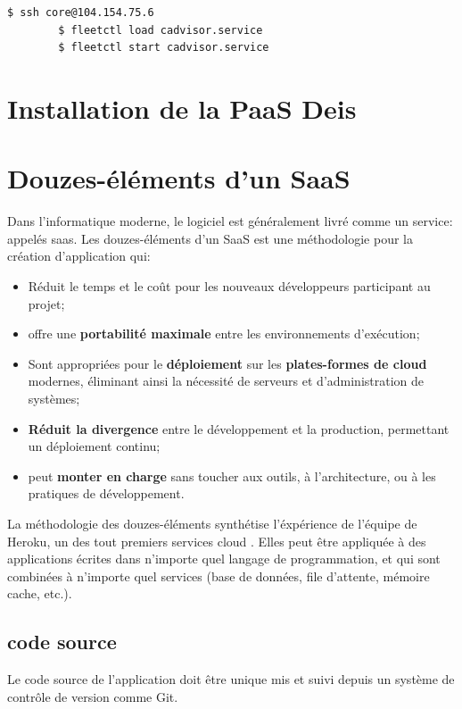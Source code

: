 	\begin{lstlisting}[language=bash,caption=Lancement des services]
		$ ssh core@104.154.75.6 
		$ fleetctl load cadvisor.service
		$ fleetctl start cadvisor.service
	\end{lstlisting}



\chapter{Installation de la PaaS Deis}

\chapter{Douzes-éléments d'un SaaS}


Dans l'informatique moderne, le logiciel est généralement livré comme un service: appelés \acrshort{saas}. Les douzes-éléments d'un SaaS est une méthodologie pour la création d'application qui:

\begin{itemize}
	\item Réduit le temps et le coût pour les nouveaux développeurs participant au projet;
	\item offre une \textbf{portabilité maximale} entre les environnements d'exécution;
	\item Sont appropriées pour le \textbf{déploiement} sur les \textbf{plates-formes de cloud} modernes, éliminant ainsi la nécessité de serveurs et d'administration de systèmes;
	\item \textbf{Réduit la divergence} entre le développement et la production, permettant un déploiement continu;
	\item peut \textbf{monter en charge} sans toucher aux outils, à l'architecture, ou à les pratiques de développement.
\end{itemize}


La méthodologie des douzes-éléments synthétise l'éxpérience de l'équipe de Heroku, un des tout premiers services cloud \cite{12-factors}. Elles peut être appliquée à des applications écrites dans n'importe quel langage de programmation, et qui sont combinées à n'importe quel services (base de données, file d'attente, mémoire cache, etc.).


\section*{code source}

Le code source de l'application doit être unique mis et suivi depuis un système de contrôle de version comme Git.

